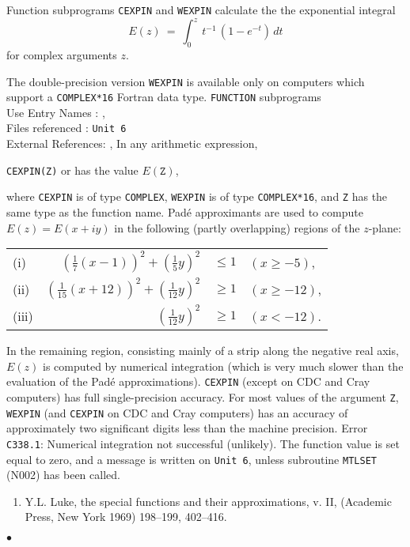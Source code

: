               
          
\Submitter{}                
              
Function subprograms {\tt CEXPIN} and {\tt WEXPIN} calculate
the the exponential integral
$$ E(z) \ = \ \displaystyle \int^{z}_{0}\,t^{-1}\,(1 - e^{-t})\,dt $$
for complex arguments $z$.
\par
The double-precision version {\tt WEXPIN} is available only on computers
which support a {\tt COMPLEX*16} Fortran data type.
\Structure
{\tt FUNCTION} subprograms \\
Use Entry Names : ,  \\
Files referenced : {\tt Unit 6} \\
External References: , 
\Usage
In any arithmetic expression,
\begin{center}
{\tt CEXPIN(Z)} \quad or  \quad has the value \quad
$E(\mathtt{Z})$,
\end{center}
where {\tt CEXPIN} is of type {\tt COMPLEX}, {\tt WEXPIN} is of type
{\tt COMPLEX*16}, and {\tt Z} has the same type as the function name.
\Method
Pad\'e approximants are used to compute $E(z) = E(x + iy)$ in the
following (partly overlapping) regions of the $z$-plane:
\begin{center}\begin{tabular}{lrcl}
(i)  & $ \textstyle (\frac{1}{7}(x - 1))^2 + (\frac{1}{5}y)^2$ &
$\le 1$ & $(x \ge - 5)$,\\[3mm]
(ii)& $ \textstyle (\frac{1}{15}(x + 12))^2 + (\frac{1}{12}y)^2$ &
$\ge 1$ & $(x \ge - 12)$,\\[3mm]
(iii)& $\textstyle(\frac{1}{12}y)^2$ & $\ge 1$ & $(x < - 12)$.
\end{tabular}\end{center}
In the remaining region, consisting mainly of a strip along the negative
real axis, $E(z)$ is computed by numerical integration (which is very
much slower than the evaluation of the Pad\'e approximations).
\Accuracy
{\tt CEXPIN} (except on CDC and Cray computers)
has full single-precision accuracy.
For most values of the argument {\tt Z}, {\tt WEXPIN}
(and {\tt CEXPIN} on CDC and Cray computers) has an accuracy of
approximately two significant digits less than the machine precision.
\Errorh
Error {\tt C338.1}: Numerical integration not successful (unlikely).
The function value is set equal to zero, and a message is written on
{\tt Unit 6}, unless subroutine {\tt MTLSET} (N002) has been called.
\Refer
\begin{enumerate}
\item Y.L. Luke, the special functions and their approximations, v. II,
(Academic Press, New York 1969) 198--199, 402--416.
\end{enumerate}
$\bullet$

